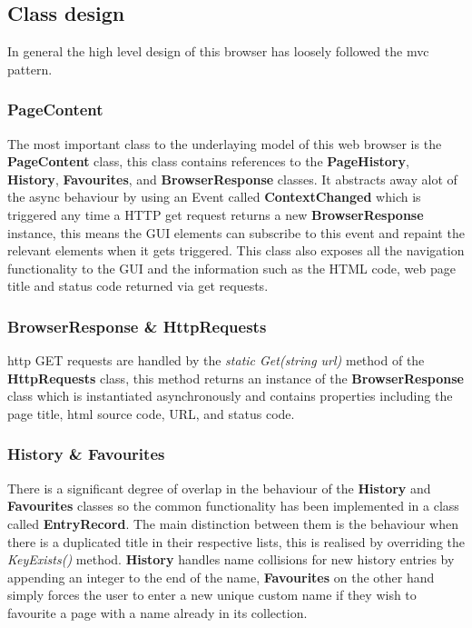 \documentclass[../Main.tex]{subfiles}
\begin{document}
\subsection{Class design}

In general the high level design of this browser has loosely followed the \acrshort{mvc} pattern. 

\subsubsection{PageContent}
The most important class to the underlaying model of this web browser is the \textbf{PageContent} class, this class contains references to the \textbf{PageHistory}, \textbf{History}, \textbf{Favourites}, and \textbf{BrowserResponse} classes. 
It abstracts away alot of the async behaviour by using an Event called \textbf{ContextChanged} which is triggered any time a HTTP get request returns a new \textbf{BrowserResponse} instance, this means the GUI elements can subscribe to this event and repaint the relevant elements when it gets triggered. 
This class also exposes all the navigation functionality to the GUI and the information such as the HTML code, web page title and status code returned via get requests.

\subsubsection{BrowserResponse \& HttpRequests}
\acrshort{http} GET requests are handled by the \emph{static Get(string url)} method of the \textbf{HttpRequests} class, this method returns an instance of the \textbf{BrowserResponse} class which is instantiated asynchronously and contains properties including the page title, \acrshort{html} source code, URL, and status code.

\subsubsection{History \& Favourites}
There is a significant degree of overlap in the behaviour of the \textbf{History} and \textbf{Favourites} classes so the common functionality has been implemented in a class called \textbf{EntryRecord}. The main distinction between them is the behaviour when there is a duplicated title in their respective lists, this is realised by overriding the \emph{KeyExists()} method. \textbf{History} handles name collisions for new history entries by appending an integer to the end of the name, \textbf{Favourites} on the other hand simply forces the user to enter a new unique custom name if they wish to favourite a page with a name already in its collection.
\end{document}
